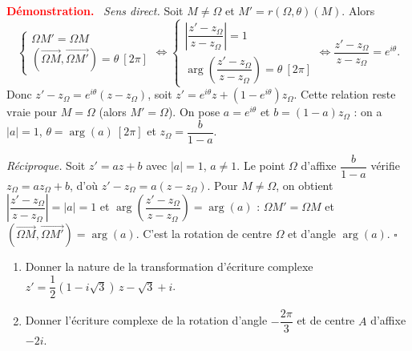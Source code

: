 \documentclass[12pt,a4paper]{article}
\newcommand{\zO}{z_{\Omega}}
\newcommand{\arge}{\operatorname{arg}}
\newenvironment{demo}
  {\par\smallskip\noindent\textbf{\textcolor{red}{Démonstration.}}\ }
  {\hfill$\square$\par\smallskip}
\begin{document}
\begin{demo}
\emph{Sens direct.} Soit $M\neq\Omega$ et $M'=r(\Omega,\theta)(M)$. Alors
\[
\begin{cases}
\Omega M'=\Omega M\\
(\overrightarrow{\Omega M},\overrightarrow{\Omega M'})=\theta\ [2\pi]
\end{cases}
\iff
\begin{cases}
\left|\dfrac{z'-\zO}{z-\zO}\right|=1\\[2mm]
\arge\!\left(\dfrac{z'-\zO}{z-\zO}\right)=\theta\ [2\pi]
\end{cases}
\iff \dfrac{z'-\zO}{z-\zO}=e^{i\theta}.
\]
Donc $z'-\zO=e^{i\theta}(z-\zO)$, soit $z'=e^{i\theta}z+(1-e^{i\theta})\zO$. Cette relation reste vraie
pour $M=\Omega$ (alors $M'=\Omega$). On pose $a=e^{i\theta}$ et $b=(1-a)\zO$ : on a $|a|=1$,
$\theta=\arge(a)\ [2\pi]$ et $\zO=\dfrac{b}{1-a}$.

\emph{Réciproque.} Soit $z'=az+b$ avec $|a|=1$, $a\neq1$. Le point $\Omega$ d'affixe $\dfrac{b}{1-a}$ vérifie
$\zO=a\zO+b$, d'où $z'-\zO=a(z-\zO)$. Pour $M\neq\Omega$, on obtient
$\left|\dfrac{z'-\zO}{z-\zO}\right|=|a|=1$ et $\arge\!\left(\dfrac{z'-\zO}{z-\zO}\right)=\arge(a)$ :
$\Omega M'=\Omega M$ et $(\overrightarrow{\Omega M},\overrightarrow{\Omega M'})=\arge(a)$.
C'est la rotation de centre $\Omega$ et d'angle $\arge(a)$.
\end{demo}

\begin{exo}
\begin{enumerate}
  \item Donner la nature de la transformation d'écriture complexe $z'=\dfrac12(1-i\sqrt3)\,z-\sqrt3+i$.
  \item Donner l'écriture complexe de la rotation d'angle $-\dfrac{2\pi}{3}$ et de centre $A$ d'affixe $-2i$.
\end{enumerate}
\end{exo}
\end{document}
